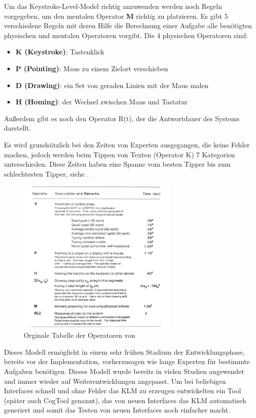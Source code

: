 Um das Keystroke-Level-Model richtig anzuwenden werden noch Regeln vorgegeben, um den mentalen Operator \textbf{M} richtig zu platzieren. 
Es gibt 5 verschiedene Regeln mit deren Hilfe die Berechnung einer Aufgabe alle benötigten physischen und mentalen Operatoren vorgibt. 
Die 4 physischen Operatoren sind:
\begin{itemize}
	\item \textbf{K (Keystroke)}: Tastenklick
	\item \textbf{P (Pointing)}: Maus zu einem Zielort verschieben
	\item \textbf{D (Drawing)}: ein Set von geraden Linien mit der Maus malen
	\item \textbf{H (Homing)}: der Wechsel zwischen Maus und Tastatur
\end{itemize}
Außerdem gibt es noch den Operator R(t), der die Antwortdauer des Systems darstellt. 

Es wird grundsätzlich bei den Zeiten von Experten ausgegangen, die keine Fehler machen, jedoch werden beim Tippen von Texten (Operator K) 7 Kategorien unterschieden. 
Diese Zeiten haben eine Spanne vom besten Tipper bis zum schlechtesten Tipper, siehe .
\begin{figure}
	\centering
		\includegraphics[width=0.7\textwidth]{img/KLM_OPeratoren.JPG}
	\caption{Orginale Tabelle der Operatoren von \citet{Card_1980}}
	\label{fig:KLM_OPeratoren}
\end{figure}

Dieses Modell ermöglicht in einem sehr frühen Stadium der Entwicklungsphase, bereits vor der Implementation, vorherzusagen wie lange Experten für bestimmte Aufgaben benötigen. 
Dieses Modell wurde bereits in vielen Studien angewendet und immer wieder auf Weiterentwicklungen angepasst.
Um bei beliebigen Interfaces schnell und ohne Fehler das KLM zu erzeugen entwickelten \citet{John_2004} ein Tool (später auch CogTool genannt), das von neuen Interfaces das KLM automatisch generiert und somit das Testen von neuen Interfaces noch einfacher macht.

